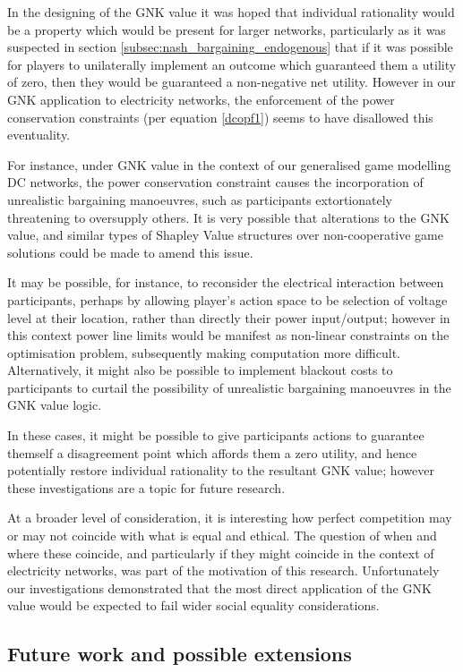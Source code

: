 In the designing of the GNK value it was hoped that individual rationality would be a property which would be present for larger networks, particularly as it was suspected in section \ref{subsec:nash_bargaining_endogenous} that if it was possible for players to unilaterally implement an outcome which guaranteed them a utility of zero, then they would be guaranteed a non-negative net utility.
However in our GNK application to electricity networks, the enforcement of the power conservation constraints (per equation \ref{dcopf1}) seems to have disallowed this eventuality.

For instance, under GNK value in the context of our generalised game modelling DC networks, the power conservation constraint causes the incorporation of unrealistic bargaining manoeuvres, such as participants extortionately threatening to oversupply others.
It is very possible that alterations to the GNK value, and similar types of Shapley Value structures over non-cooperative game solutions could be made to amend this issue.

It may be possible, for instance, to reconsider the electrical interaction between participants, perhaps by allowing player's action space to be selection of voltage level at their location, rather than directly their power input/output; however in this context power line limits would be manifest as non-linear constraints on the optimisation problem, subsequently making computation more difficult.
Alternatively, it might also be possible to implement blackout costs to participants to curtail the possibility of unrealistic bargaining manoeuvres in the GNK value logic.

In these cases, it might be possible to give participants actions to guarantee themself a disagreement point which affords them a zero utility, and hence potentially restore individual rationality to the resultant GNK value; however these investigations are a topic for future research.

At a broader level of consideration, it is interesting how perfect competition may or may not coincide with what is equal and ethical.
The question of when and where these coincide, and particularly if they might coincide in the context of electricity networks, was part of the motivation of this research.
Unfortunately our investigations demonstrated that the most direct application of the GNK value would be expected to fail wider social equality considerations.



\subsection{Future work and possible extensions}\label{sec:GNK_extensions_discussion}

